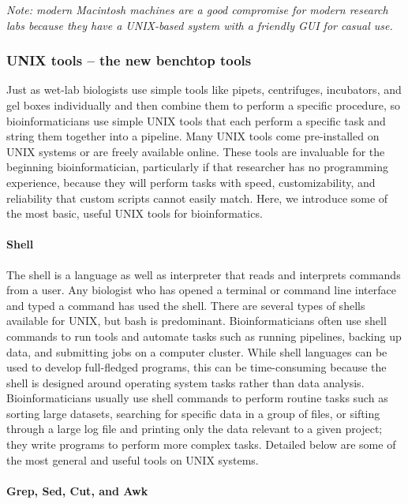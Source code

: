 \documentclass[ChapterTOCs,krantz2]{krantz} %
\newcommand{\unix}{UNIX}
\begin{document}
\textsl{Note: modern Macintosh machines are a
good compromise for modern research labs because they 
have a \unix{}-based system with a friendly GUI for casual use.}

\subsubsection{\unix{} tools -- the new benchtop tools}

Just as wet-lab biologists use simple tools like pipets, centrifuges,
incubators, and gel boxes individually and then combine them to perform a
specific procedure, so bioinformaticians use simple \unix{} tools
that each perform a specific task and string them together into a pipeline.
Many \unix{} tools come pre-installed on \unix{} systems or are freely
available online. These tools are invaluable for the beginning
bioinformatician, particularly if that researcher has no programming experience, 
because they will perform tasks with speed, customizability, and
reliability that custom scripts cannot easily match.  Here, we
introduce some of the most basic, useful \unix{} tools for bioinformatics.

\paragraph{Shell}

The shell is a language as well as interpreter that reads and interprets commands
from a user. Any biologist who has opened a terminal or command line interface
and typed a command has used the shell. There are several types of shells available 
for \unix{}, but bash is predominant. 
Bioinformaticians often use shell commands to
run tools and automate tasks such as running pipelines, backing up
data, and submitting jobs on a computer cluster. While shell languages can be
used to develop full-fledged programs, this can be time-consuming 
because the shell is designed around operating system tasks rather than
data analysis.
Bioinformaticians usually use shell commands to perform routine tasks such as
sorting large datasets,
searching for specific data in a group of files, or sifting through a large log
file and printing only the data relevant to a given project; they write programs to perform 
more complex tasks.  Detailed below are
some of the most general and useful tools on
\unix{} systems.

\paragraph{Grep, Sed, Cut, and Awk}
\end{document}
